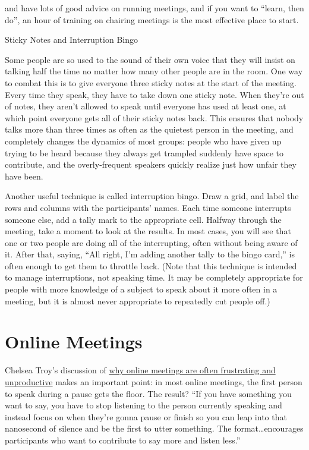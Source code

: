 \cite{Brow2007} and \cite{Broo2016} have lots of good advice on
running meetings, and if you want to ``learn, then do'', an hour of
training on chairing meetings is the most effective place to start.

\begin{aside}{Sticky Notes and Interruption Bingo}

Some people are so used to the sound of their own voice that they will
insist on talking half the time no matter how many other people are in
the room. One way to combat this is to give everyone three sticky
notes at the start of the meeting. Every time they speak, they have to
take down one sticky note. When they're out of notes, they aren't
allowed to speak until everyone has used at least one, at which point
everyone gets all of their sticky notes back. This ensures that nobody
talks more than three times as often as the quietest person in the
meeting, and completely changes the dynamics of most groups: people
who have given up trying to be heard because they always get trampled
suddenly have space to contribute, and the overly-frequent speakers
quickly realize just how unfair they have been.

Another useful technique is called interruption bingo. Draw a grid,
and label the rows and columns with the participants' names. Each time
someone interrupts someone else, add a tally mark to the appropriate
cell. Halfway through the meeting, take a moment to look at the
results. In most cases, you will see that one or two people are doing
all of the interrupting, often without being aware of it. After that,
saying, ``All right, I'm adding another tally to the bingo card,'' is
often enough to get them to throttle back. (Note that this technique
is intended to manage interruptions, not speaking time. It may be
completely appropriate for people with more knowledge of a subject to
speak about it more often in a meeting, but it is almost never
appropriate to repeatedly cut people off.)

\end{aside}

\section{Online Meetings}\label{online-meetings}

Chelsea Troy's discussion of \href{https://chelseatroy.com/2018/03/29/why-do-remote-meetings-suck-so-much/}{why online meetings are often
frustrating and unproductive} makes an important point:
in most online meetings, the first person to speak during a pause gets
the floor. The result? ``If you have something you want to say, you
have to stop listening to the person currently speaking and instead
focus on when they're gonna pause or finish so you can leap into that
nanosecond of silence and be the first to utter something. The
format\ldots{}encourages participants who want to contribute to say more
and listen less.''

